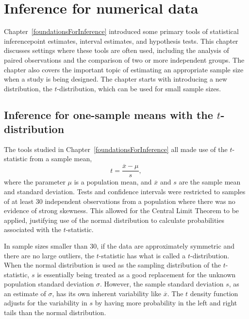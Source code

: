 
\chapter{Inference for numerical data}
\label{inferenceForNumericalData}





Chapter~\ref{foundationsForInference} introduced some primary tools of statistical inference\textemdash point estimates, interval estimates, and hypothesis tests. This chapter discusses settings where these tools are often used, including the analysis of paired observations and the comparison of two or more independent groups. The chapter also covers the important topic of estimating an appropriate sample size when a study is being designed.  The chapter starts with introducing a new distribution, the $t$-distribution, which can be used for small sample sizes. 


\section{Inference for one-sample means with the $t$-distribution}
\label{oneSampleMeansWithTDistribution}

The tools studied in Chapter~\ref{foundationsForInference} all made use of the $t$-statistic from a sample mean,
\[t = \frac{\overline{x} - \mu}{s},\]
where the parameter $\mu$ is a population mean, and $\overline{x}$ and $s$ are the sample mean and standard deviation. Tests and confidence intervals were restricted to samples of at least 30 independent observations from a population where there was no evidence of strong skewness. This allowed for the Central Limit Theorem to be applied, justifying use of the normal distribution to calculate probabilities associated with the $t$-statistic. 

In sample sizes smaller than 30, if the data are approximately symmetric and there are no large outliers, the $t$-statistic has what is called a $t$-distribution. When the normal distribution is used as the sampling distribution of the $t$-statistic, $s$ is essentially being treated as a good replacement for the unknown population standard deviation $\sigma$. However, the sample standard deviation $s$, as an estimate of $\sigma$, has its own inherent variability like $\overline{x}$. The $t$ density function adjusts for the variability in $s$ by having more probability in the left and right tails than the normal distribution.

